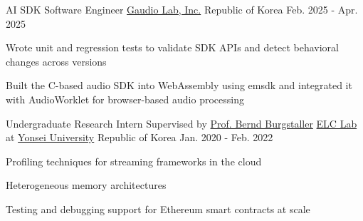 

\begin{cventries}

  \cventry
    {AI SDK Software Engineer} %
    {\href{https://www.gaudiolab.com}{Gaudio Lab, Inc.}} %
    {Republic of Korea} %
    {Feb. 2025 - Apr. 2025} %
    {
      \begin{cvitems} %
        \item {Wrote unit and regression tests to validate SDK APIs and detect behavioral changes across versions}
        \item {Built the C-based audio SDK into WebAssembly using emsdk and integrated it with AudioWorklet for browser-based audio processing}
      \end{cvitems}
    }


  \cventry
    {Undergraduate Research Intern Supervised by \href{https://cs.yonsei.ac.kr/bbs/board.php?bo_table=sub2_1_a&wr_id=18}{Prof. Bernd Burgstaller}} %
    {\href{https://elc.yonsei.ac.kr}{ELC Lab} at \href{https://www.yonsei.ac.kr/sc/index.jsp}{Yonsei University}} %
    {Republic of Korea} %
    {Jan. 2020 - Feb. 2022} %
    {
      \begin{cvitems} %
        \item {Profiling techniques for streaming frameworks in the cloud}
        \item {Heterogeneous memory architectures}
        \item {Testing and debugging support for Ethereum smart contracts at scale}
      \end{cvitems}
    }

\end{cventries}
